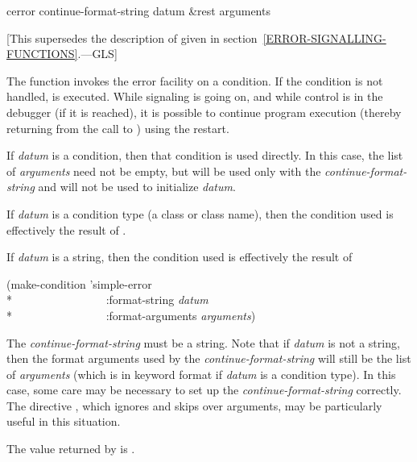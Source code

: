 \begin{defun}[Function]
cerror continue-format-string datum &rest arguments

   [This supersedes the description of 
   given in section~\ref{ERROR-SIGNALLING-FUNCTIONS}.---GLS]

  The function 
  invokes the error facility on a condition. If the condition is not handled,
   is executed. While signaling is going on,
  and
  while control is in the debugger (if it is reached), it is possible to continue
  program execution (thereby returning from the call to )
  using the  restart.

  If \emph{datum} is a condition, then that condition is used directly. 
  In this case, the list of \emph{arguments} need not be empty,
  but will be used only with the \emph{continue-format-string}
  and will not be used to initialize \emph{datum}.

  If \emph{datum} is a condition type (a class or class name), then the condition used is effectively the result
  of .

  If \emph{datum} is a string, then the condition used is effectively the result of
\begin{lisp}
(make-condition 'simple-error \\*
~~~~~~~~~~~~~~~~:format-string \emph{datum} \\*
~~~~~~~~~~~~~~~~:format-arguments \emph{arguments})
\end{lisp}

  The \emph{continue-format-string} must be a string.
  Note that if \emph{datum} is not a 
  string, then the format arguments used by the \emph{continue-format-string} will
  still be the list of \emph{arguments} (which is in keyword format if \emph{datum} is a condition
  type). In this case, some care may be necessary to set up the
  \emph{continue-format-string} correctly. The  directive \cd{{\Xtilde}*},
  which ignores and skips over  arguments,
  may be particularly 
  useful in this situation.

  The value returned by  is .
\end{defun}

